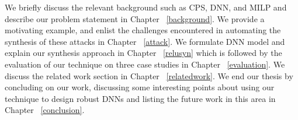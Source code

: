 	
We briefly discuss the relevant background such as \ac{CPS}, \ac{DNN}, and \ac{MILP} and describe our problem statement in Chapter ~\ref{background}.
We provide a motivating example, and enlist the challenges encountered in automating the synthesis of these attacks in Chapter ~\ref{attack}.
We formulate \ac{DNN} model and explain our synthesis approach in Chapter ~\ref{relusyn} which is followed by the evaluation of our technique on three case studies in Chapter ~\ref{evaluation}.
We discuss the related work section in Chapter ~\ref{relatedwork}.
We end our thesis by concluding on our work, discussing some interesting points about using our technique to design robust \ac{DNN}s and listing the future work in this area in Chapter ~\ref{conclusion}.









